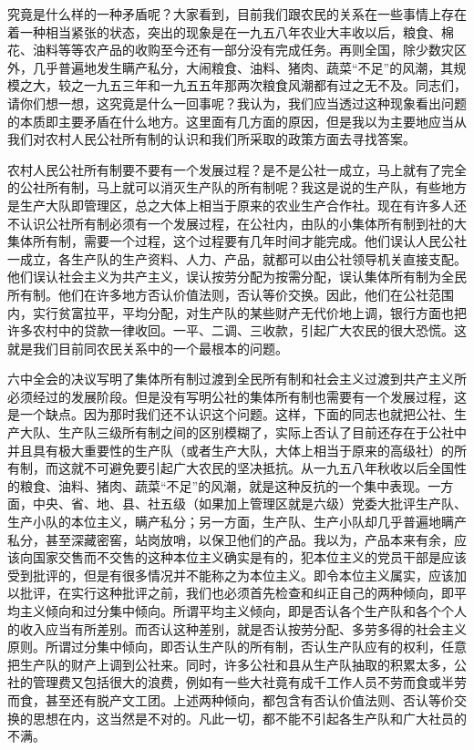 究竟是什么样的一种矛盾呢？大家看到，目前我们跟农民的关系在一些事情上存在着一种相当紧张的状态，突出的现象是在一九五八年农业大丰收以后，粮食、棉花、油料等等农产品的收购至今还有一部分没有完成任务。再则全国，除少数灾区外，几乎普遍地发生瞒产私分，大闹粮食、油料、猪肉、蔬菜“不足”的风潮，其规模之大，较之一九五三年和一九五五年那两次粮食风潮都有过之无不及。同志们，请你们想一想，这究竟是什么一回事呢？我认为，我们应当透过这种现象看出问题的本质即主要矛盾在什么地方。这里面有几方面的原因，但是我以为主要地应当从我们对农村人民公社所有制的认识和我们所采取的政策方面去寻找答案。

农村人民公社所有制要不要有一个发展过程？是不是公社一成立，马上就有了完全的公社所有制，马上就可以消灭生产队的所有制呢？我这是说的生产队，有些地方是生产大队即管理区，总之大体上相当于原来的农业生产合作社。现在有许多人还不认识公社所有制必须有一个发展过程，在公社内，由队的小集体所有制到社的大集体所有制，需要一个过程，这个过程要有几年时间才能完成。他们误认人民公社一成立，各生产队的生产资料、人力、产品，就都可以由公社领导机关直接支配。他们误认社会主义为共产主义，误认按劳分配为按需分配，误认集体所有制为全民所有制。他们在许多地方否认价值法则，否认等价交换。因此，他们在公社范围内，实行贫富拉平，平均分配，对生产队的某些财产无代价地上调，银行方面也把许多农村中的贷款一律收回。一平、二调、三收款，引起广大农民的很大恐慌。这就是我们目前同农民关系中的一个最根本的问题。

六中全会的决议写明了集体所有制过渡到全民所有制和社会主义过渡到共产主义所必须经过的发展阶段。但是没有写明公社的集体所有制也需要有一个发展过程，这是一个缺点。因为那时我们还不认识这个问题。这样，下面的同志也就把公社、生产大队、生产队三级所有制之间的区别模糊了，实际上否认了目前还存在于公社中并且具有极大重要性的生产队（或者生产大队，大体上相当于原来的高级社）的所有制，而这就不可避免要引起广大农民的坚决抵抗。从一九五八年秋收以后全国性的粮食、油料、猪肉、蔬菜“不足”的风潮，就是这种反抗的一个集中表现。一方面，中央、省、地、县、社五级（如果加上管理区就是六级）党委大批评生产队、生产小队的本位主义，瞒产私分；另一方面，生产队、生产小队却几乎普遍地瞒产私分，甚至深藏密窖，站岗放哨，以保卫他们的产品。我以为，产品本来有余，应该向国家交售而不交售的这种本位主义确实是有的，犯本位主义的党员干部是应该受到批评的，但是有很多情况并不能称之为本位主义。即令本位主义属实，应该加以批评，在实行这种批评之前，我们也必须首先检查和纠正自己的两种倾向，即平均主义倾向和过分集中倾向。所谓平均主义倾向，即是否认各个生产队和各个个人的收入应当有所差别。而否认这种差别，就是否认按劳分配、多劳多得的社会主义原则。所谓过分集中倾向，即否认生产队的所有制，否认生产队应有的权利，任意把生产队的财产上调到公社来。同时，许多公社和县从生产队抽取的积累太多，公社的管理费又包括很大的浪费，例如有一些大社竟有成千工作人员不劳而食或半劳而食，甚至还有脱产文工团。上述两种倾向，都包含有否认价值法则、否认等价交换的思想在内，这当然是不对的。凡此一切，都不能不引起各生产队和广大社员的不满。

